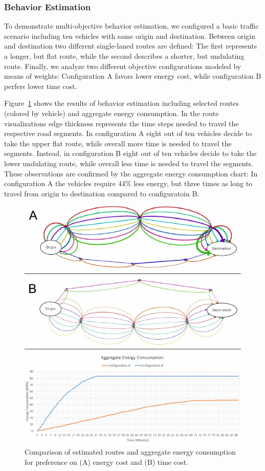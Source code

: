 \documentclass[conference]{../cls/IEEEtran}
\begin{document}
\subsubsection*{Behavior Estimation}

To demonstrate multi-objective behavior estimation, we configured a basic traffic scenario including ten vehicles with same origin and destination. Between origin and destination two different single-laned routes are defined: The first represents a longer, but flat route, while the second describes a shorter, but undulating route. Finally, we analyze two different objective configurations modeled by means of weights: Configuration A favors lower energy cost, while configuration B perfers lower time cost.

Figure~\ref{figure:results} shows the results of behavior estimation including selected routes (colored by vehicle) and aggregate energy consumption. In the route visualizations edge thickness represents the time steps needed to travel the respective road segments. In configuration A eight out of ten vehicles decide to take the upper flat route, while overall more time is needed to travel the segments. Instead, in configuration B eight out of ten vehicles decide to take the lower undulating route, while overall less time is needed to travel the segments. These observations are confirmed by the aggregate energy consumption chart: In configuration A the vehicles require 44\% less energy, but three times as long to travel from origin to destination compared to configuratoin B.

\begin{figure}[t!]
	\includegraphics[width=\columnwidth]{../gfx/results.pdf}
	\caption{Comparison of estimated routes and aggregate energy consumption for preference  on (A) energy cost and (B) time cost.}
	\label{figure:results}
\end{figure}
\end{document}

